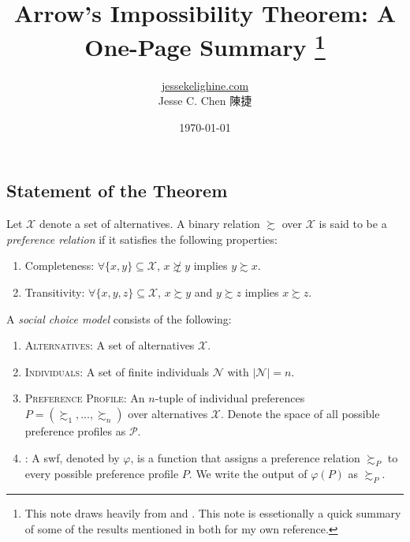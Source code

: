 \documentclass[a4paper]{article}
\title{Arrow's Impossibility Theorem: A One-Page Summary%
\thanks{This note draws heavily from \textcite{maskin-sen-2014} \citetitle{maskin-sen-2014} and
\textcite{rubinstein-2006} \citetitle{rubinstein-2006}. This note is essetionally a quick summary
of some of the results mentioned in both for my own reference.}%
}
\author{\href{https://jessekelighine.com}{jessekelighine.com}\\Jesse C. Chen 陳捷}
\date{\today}
\begin{document}
\maketitle

\begin{multicols}{2}

\section{Statement of the Theorem}

\begin{definition}
	Let $\mathcal{X}$ denote a set of alternatives.
	A binary relation $\succsim$ over $\mathcal{X}$ is said to be a \emph{preference relation}
	if it satisfies the following properties:
	\begin{enumerate}
		\item Completeness:
			$\forall \{x,y\}\subseteq\mathcal{X}$, $x\not\succsim y$ implies $y\succsim x$.
		\item Transitivity:
			$\forall \{x,y,z\}\subseteq\mathcal{X}$, $x\succsim y$ and $y\succsim z$ implies $x\succsim z$.
	\end{enumerate}
\end{definition}

\begin{definition}
	A \emph{social choice model} consists of the following:
	\begin{enumerate}
		\item \textsc{Alternatives}:
			A set of alternatives $\mathcal{X}$.
		\item \textsc{Individuals}:
			A set of finite individuals $\mathcal{N}$ with $|\mathcal{N}|=n$.
		\item \textsc{Preference Profile}:
			An $n$-tuple of individual preferences $P=(\succsim_1,...,\succsim_n)$ over alternatives $\mathcal{X}$.
			Denote the space of all possible preference profiles as $\mathcal{P}$.
		\item \textsc{}:
			A \gls*{swf}, denoted by $\varphi$,
			is a function that assigns a preference relation $\succsim_P$ to every possible preference profile $P$.
			We write the output of $\varphi(P)$ as $\succsim_{P}$.
	\end{enumerate}
\end{definition}


\end{multicols}
\end{document}
